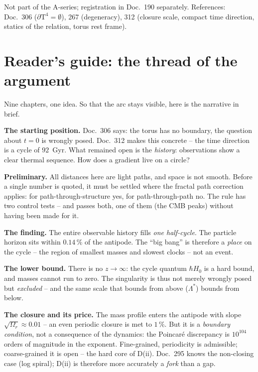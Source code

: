 Not part of the A-series; registration in Doc.~190 separately.
References: Doc.~306 ($\partial\text{T}^4 = \emptyset$), 267
(degeneracy), 312 (closure scale, compact time direction, statics
of the relation, torus rest frame).

\section*{Reader's guide: the thread of the argument}

Nine chapters, one idea. So that the arc stays visible, here is
the narrative in brief.

\textbf{The starting position.} Doc.~306 says: the torus has no
boundary, the question about $t=0$ is wrongly posed. Doc.~312
makes this concrete -- the time direction is a cycle of $92$~Gyr.
What remained open is the \emph{history}: observations show a
clear thermal sequence. How does a gradient live on a circle?

\textbf{Preliminary.} All distances here are light paths, and
space is not smooth. Before a single number is quoted, it must be
settled where the fractal path correction applies: for
path-through-structure yes, for path-through-path no. The rule has
two control tests -- and passes both, one of them (the CMB peaks)
without having been made for it.

\textbf{The finding.} The entire observable history fills
\emph{one half-cycle}. The particle horizon sits within
$0.14\,\%$ of the antipode. The \enquote{big bang} is therefore a
\emph{place} on the cycle -- the region of smallest masses and
slowest clocks -- not an event.

\textbf{The lower bound.} There is no $z \to \infty$: the cycle
quantum $\hbar H_0$ is a hard bound, and masses cannot run to
zero. The singularity is thus not merely wrongly posed but
\emph{excluded} -- and the same scale that bounds from above
($\Lambda^{*}$) bounds from below.

\textbf{The closure and its price.} The mass profile enters the
antipode with slope $\sqrt{\Omega_r} \approx 0.01$ -- an even
periodic closure is met to $1\,\%$. But it is a \emph{boundary
condition}, not a consequence of the dynamics: the Poincaré
discrepancy is $10^{104}$ orders of magnitude in the exponent.
Fine-grained, periodicity is admissible; coarse-grained it is open
-- the hard core of D(ii). Doc.~295 knows the non-closing case
(log spiral); D(ii) is therefore more accurately a \emph{fork}
than a gap.

